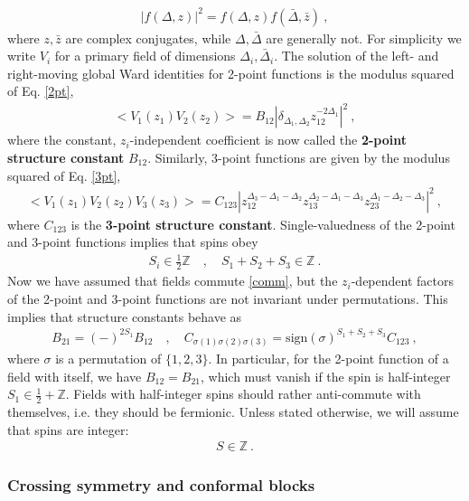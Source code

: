 \documentclass[12pt, a4paper]{article}
\theoremstyle{break}
\begin{document}
\begin{align}
 \left| f(\Delta, z)\right|^2 = f(\Delta, z)f(\bar\Delta,\bar z)\ ,
 \label{fdz2}
\end{align}
where $z,\bar z$ are complex conjugates, while $\Delta,\bar\Delta$ are generally not. 
For simplicity we write $V_i$ for a primary field of dimensions $\Delta_i,\bar\Delta_i$.
The solution of the left- and right-moving global Ward identities for 2-point functions is the modulus squared of Eq. \eqref{2pt},
\begin{align}
\boxed{ \Big< V_1(z_1)V_2(z_2) \Big> = B_{12} \left|\delta_{\Delta_1,\Delta_2} z_{12}^{-2\Delta_1}\right|^2} \ ,
\label{2ptb}
\end{align}
where the constant, $z_i$-independent coefficient is now called the \textbf{2-point structure constant} $B_{12}$. Similarly, 3-point functions are given by the modulus squared of Eq. \eqref{3pt},
\begin{align}
 \boxed{  \Big< V_1(z_1)V_2(z_2)V_3(z_3) \Big> = C_{123} \left|z_{12}^{\Delta_3-\Delta_1-\Delta_2} z_{13}^{\Delta_2-\Delta_1-\Delta_3} z_{23}^{\Delta_1-\Delta_2-\Delta_3}\right|^2 }\ ,
 \label{3ptc}
\end{align}
where $C_{123}$ is the \textbf{3-point structure constant}. Single-valuedness of the 2-point and 3-point functions implies that spins obey
\begin{align}
 S_i\in\frac12 \mathbb{Z} \quad , \quad S_1+S_2+S_3 \in\mathbb{Z}\ . 
 \label{sihz}
\end{align}
Now we have assumed that fields commute \eqref{comm}, but the $z_i$-dependent factors of the 2-point and 3-point functions are not invariant under permutations. This implies that structure constants behave as
\begin{align}
 B_{21} = (-)^{2S_1} B_{12} \quad ,\quad C_{\sigma(1)\sigma(2)\sigma(3)} = \text{sign}(\sigma)^{S_1+S_2+S_3} C_{123}\ , 
 \label{b21}
\end{align}
where $\sigma$ is a permutation of $\{1,2,3\}$. In particular, for the 2-point function of a field with itself, we have $B_{12}=B_{21}$, which must vanish if the spin is half-integer $S_1\in \frac12+\mathbb{Z}$. Fields with half-integer spins should rather anti-commute with themselves, i.e. they should be fermionic. 
Unless stated otherwise, we will assume that spins are integer:
\begin{align}
 \boxed{S\in \mathbb{Z}}\ .
 \label{siz}
\end{align}

\subsubsection{Crossing symmetry and conformal blocks}\label{sec:cscb}
\end{document}
